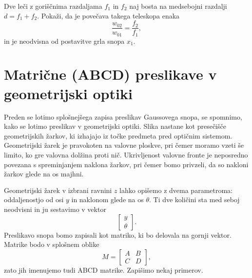 \begin{definition}
\label{teleskop}
Dve leči z goriščnima razdaljama $f_{1}$ in $f_{2}$ naj bosta na medsebojni
razdalji $d=f_{1}+f_{2}$. Pokaži, da je povečava takega teleskopa enaka  
\begin{equation}
\frac{w_{02}}{w_{01}}=\frac{f_{2}}{f_{1}},
\label{eq:povecava-teleskop}
\end{equation}
in je neodvisna od postavitve grla snopa $x_{1}$.
\end{definition}

\section{Matrične (ABCD) preslikave v geometrijski optiki}

Preden se lotimo splošnejšega zapisa preslikav Gaussovega snopa, se spomnimo, kako
se lotimo preslikav v geometrijski optiki. 
Slika nastane kot presečišče geometrijskih žarkov,
ki izhajajo iz točke predmeta pred optičnim sistemom. Geometrijski
žarek je pravokoten na valovne ploskve, pri čemer moramo vzeti še limito,
ko gre valovna dolžina proti nič. Ukrivljenost valovne fronte je neposredno
povezana s spreminjanjem naklona žarkov, pri čemer bomo privzeli, da so 
nakloni žarkov glede na os majhni.

Geometrijski žarek v izbrani ravnini $z$ lahko opišemo z dvema parametroma: 
oddaljenostjo od osi $y$ in naklonom glede na os $\theta$. Ti dve količini 
sta med seboj neodvisni in ju sestavimo 
v vektor
\begin{equation}
\left[\begin{array}{c}
y\\
\theta
\end{array}\right].
\end{equation}
Preslikavo snopa bomo zapisali kot matriko, ki bo delovala na gornji vektor. 
Matrike bodo v splošnem oblike
\begin{equation}
M = \left[\begin{array}{cc}
A & B\\
C & D
\end{array}\right],
\end{equation}
zato jih imenujemo tudi ABCD matrike. Zapišimo nekaj primerov.

